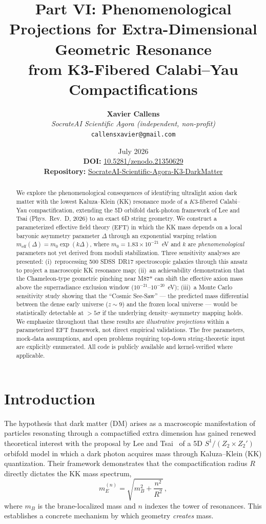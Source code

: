 \documentclass[12pt]{article}
\title{\textbf{Part VI: Phenomenological Projections for Extra-Dimensional Geometric Resonance \\[4pt] from K3-Fibered Calabi--Yau Compactifications}}
\author{\textbf{Xavier Callens} \\ \textit{SocrateAI Scientific Agora (independent, non-profit)} \\ \texttt{callensxavier@gmail.com}}
\date{July 2026 \\[0.3cm]
\textbf{DOI:} \href{https://doi.org/10.5281/zenodo.21350629}{10.5281/zenodo.21350629} \\
\textbf{Repository:} \href{https://github.com/xaviercallens/SocrateAI-Scientific-Agora-K3-DarkMatter}{SocrateAI-Scientific-Agora-K3-DarkMatter}}
\begin{document}
\maketitle

\begin{abstract}
We explore the phenomenological consequences of identifying ultralight axion dark matter with the lowest Kaluza--Klein (KK) resonance mode of a $K3$-fibered Calabi--Yau compactification, extending the 5D orbifold dark-photon framework of Lee and Tsai (Phys.\ Rev.\ D, 2026) to an exact 6D string geometry.
We construct a parameterized effective field theory (EFT) in which the KK mass depends on a local baryonic asymmetry parameter $\Delta$ through an exponential warping relation $m_{\mathrm{eff}}(\Delta) = m_0 \exp(k\Delta)$, where $m_0 = 1.83 \times 10^{-21}$~eV and $k$ are \emph{phenomenological} parameters not yet derived from moduli stabilization.
Three sensitivity analyses are presented:
(i)~reprocessing 500 SDSS~DR17 spectroscopic galaxies through this ansatz to project a macroscopic KK resonance map;
(ii)~an achievability demonstration that the Chameleon-type geometric pinching near M87* can shift the effective axion mass above the superradiance exclusion window ($10^{-21}$--$10^{-20}$~eV);
(iii)~a Monte Carlo sensitivity study showing that the ``Cosmic See-Saw'' --- the predicted mass differential between the dense early universe ($z \sim 9$) and the frozen local universe --- would be statistically detectable at $> 5\sigma$ if the underlying density--asymmetry mapping holds.
We emphasize throughout that these results are \emph{illustrative projections} within a parameterized EFT framework, not direct empirical validations.
The free parameters, mock-data assumptions, and open problems requiring top-down string-theoretic input are explicitly enumerated.
All code is publicly available and kernel-verified where applicable.
\end{abstract}

\tableofcontents

\section{Introduction}
\label{sec:intro}

The hypothesis that dark matter (DM) arises as a macroscopic manifestation of particles resonating through a compactified extra dimension has gained renewed theoretical interest with the proposal by Lee and Tsai~\cite{tsai2026} of a 5D $S^1/(Z_2 \times Z_2')$ orbifold model in which a dark photon acquires mass through Kaluza--Klein (KK) quantization.
Their framework demonstrates that the compactification radius $R$ directly dictates the KK mass spectrum,
\begin{equation}
\label{eq:kk_mass_tsai}
m_E^{(n)} = \sqrt{m_B^2 + \frac{n^2}{R^2}}\,,
\end{equation}
where $m_B$ is the brane-localized mass and $n$ indexes the tower of resonances.
This establishes a concrete mechanism by which geometry \emph{creates} mass.
\end{document}
